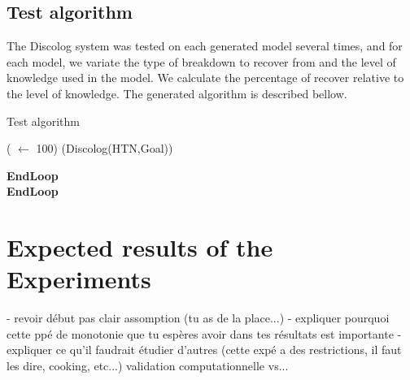 \subsection{Test algorithm}
The Discolog system was tested on each generated model several times, and for each model, we variate the type of breakdown to recover from and the level of knowledge used in the model. We calculate the percentage of recover relative to the level of knowledge. The generated algorithm is described bellow.
\begin{algorithm}
	\caption{Test algorithm }\label{test}
	\begin{algorithmic}[]
		\Loop {}
\Loop ( $\gets$ 100)
\State(Discolog(HTN,Goal))

\EndLoop\textbf{EndLoop} \\
\EndLoop\textbf{EndLoop} \\
	\end{algorithmic}
\end{algorithm}
 
\section{Expected results of the Experiments}

- revoir début pas clair assomption (tu as de la place...)
- expliquer pourquoi cette ppé de monotonie que tu espères avoir dans tes résultats est importante
- expliquer ce qu'il faudrait étudier d'autres (cette expé a des restrictions, il faut les dire, cooking, etc...) validation computationnelle vs...

